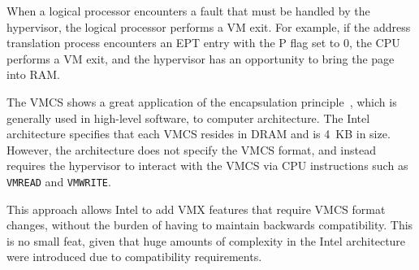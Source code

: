 When a logical processor encounters a fault that must be handled by the
hypervisor, the logical processor performs a VM exit. For example, if the
address translation process encounters an EPT entry with the P flag set to 0,
the CPU performs a VM exit, and the hypervisor has an opportunity to bring the
page into RAM.

The VMCS shows a great application of the encapsulation
principle~\cite{liskov1974adt}, which is generally used in high-level software,
to computer architecture. The Intel architecture specifies that each VMCS
resides in DRAM and is 4~KB in size. However, the architecture does not specify
the VMCS format, and instead requires the hypervisor to interact with the VMCS
via CPU instructions such as \texttt{VMREAD} and \texttt{VMWRITE}.

This approach allows Intel to add VMX features that require VMCS format
changes, without the burden of having to maintain backwards compatibility.
This is no small feat, given that huge amounts of complexity in the Intel
architecture were introduced due to compatibility requirements.
